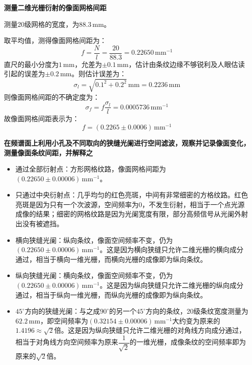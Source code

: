 \documentclass[a4paper,fontset=windows]{ctexart}
\begin{document}
    {\large\textbf{测量二维光栅衍射的像面网格间距}}

    测量20级网格的宽度，为$88.3\,\mathrm{mm}$。

    取平均值，测得像面网格间距为：
    \[
    f = \frac{N}{l} = \frac{20}{88.3} = 0.22650\,\mathrm{mm^{-1}}
    \]
    直尺的最小分度为$1\,\mathrm{mm}$，允差为$\pm0.1\,\mathrm{mm}$，估计由条纹边缘不够锐利及人眼估读引起的误差为$\pm0.2\,\mathrm{mm}$。则估计误差为：
    \[
    \sigma_l = \sqrt{0.1^2 + 0.2^2}\,\mathrm{mm} = 0.2236\,\mathrm{mm}
    \]
    则像面网格间距的不确定度为：
    \[
    \sigma_f = f\frac{\sigma_l}{l} = 0.0005736\,\mathrm{mm^{-1}}
    \]
    故像面网格间距表示为：
    \[
    f = (0.2265 \pm 0.0006)\,\mathrm{mm^{-1}}
    \]

    {\large\textbf{在频谱面上利用小孔及不同取向的狭缝光阑进行空间滤波，观察并记录像面变化，测量像面条纹间距，并解释之}}

    \begin{itemize}
        \item 通过全部衍射点：方形网格纹路，像面网格间距为$(0.22650 \pm 0.00006)\,\mathrm{mm^{-1}}$。
        \item 只通过中央衍射点：几乎均匀的红色亮斑，中间有非常细密的方格纹路。红色亮斑是因为只有一个次波源，空间频率为0，不发生衍射，相当于一个点光源成像的结果；细密的网格纹路是因为光阑宽度有限，部分高频信号从光阑外射出没有被遮挡。
        \item 横向狭缝光阑：纵向条纹，像面空间频率不变，仍为$(0.22650 \pm 0.00006)\,\mathrm{mm^{-1}}$。这是因为横向狭缝只允许二维光栅的横向成分通过，相当于横向一维光栅，而横向光栅的成像即为纵向条纹。
        \item 纵向狭缝光阑：横向条纹，像面空间频率不变，仍为$(0.22650 \pm 0.00006)\,\mathrm{mm^{-1}}$。这是因为纵向狭缝只允许二维光栅的纵向成分通过，相当于纵向一维光栅，而纵向光栅的成像即为纵向条纹。
        \item $45^\circ$方向的狭缝光阑：与之成$90^\circ$的另一个$45^\circ$方向的条纹，20级条纹宽度测量为$62.2\,\mathrm{mm}$，即空间频率为$(0.32154 \pm 0.00006)\,\mathrm{mm^{-1}}$大约变为原来的$1.4196 \approx \sqrt{2}$倍。这是因为纵向狭缝只允许二维光栅的对角线方向成分通过，相当于对角线方向空间频率为原来$\dfrac{1}{\sqrt{2}}$的一维光栅，成像条纹的空间频率即为原来的$\sqrt{2}$倍。
    \end{itemize}
\end{document}
